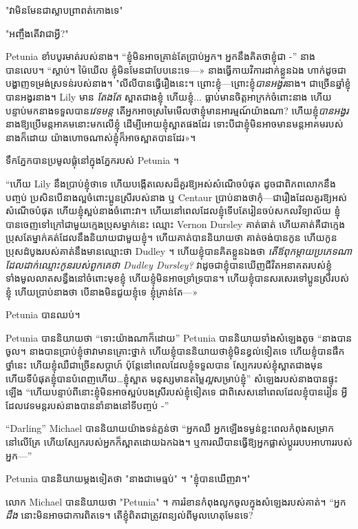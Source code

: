 "វាមិនមែនជាស្លាបព្រាពត់កោងទេ"

"អញ្ចឹងតើវាជាអ្វី?"

Petunia ខាំបបូរមាត់របស់នាង។ “ខ្ញុំ​មិន​អាច​គ្រាន់​តែ​ប្រាប់​អ្នក​។ អ្នកនឹងគិតថាខ្ញុំជា -” នាងបានលេប។ “ស្តាប់។ ម៉ៃឃើល ខ្ញុំ​មិន​មែន​ជា​បែប​នេះ​ទេ—» នាង​ធ្វើ​កាយវិការ​ដាក់​ខ្លួន​ឯង ហាក់​ដូច​ជា​បង្ហាញ​ទម្រង់​ស្រទន់​របស់​នាង។ "លីលីបានធ្វើរឿងនេះ។ ព្រោះខ្ញុំ—ព្រោះខ្ញុំ\emph{បានអង្វរ}នាង។ ជាច្រើនឆ្នាំខ្ញុំបានអង្វរនាង។ Lily មាន \emph{តែងតែ} ស្អាតជាងខ្ញុំ ហើយខ្ញុំ... ធ្លាប់មានចិត្តអាក្រក់ចំពោះនាង ហើយបន្ទាប់មកនាងទទួលបាន\emph{វេទមន្ត} តើអ្នកអាចស្រមៃមើលថាខ្ញុំមានអារម្មណ៍យ៉ាងណា? ហើយខ្ញុំ\emph{បានអង្វរ}នាងឱ្យប្រើមន្តអាគមនោះមកលើខ្ញុំ ដើម្បីអោយខ្ញុំស្អាតផងដែរ ទោះបីជាខ្ញុំមិនអាចមានមន្តអាគមរបស់នាងក៏ដោយ យ៉ាងហោចណាស់ខ្ញុំក៏អាចស្អាតបានដែរ»។

ទឹកភ្នែកបានប្រមូលផ្តុំនៅក្នុងភ្នែករបស់ Petunia ។

“ហើយ Lily នឹងប្រាប់ខ្ញុំថាទេ ហើយបង្កើតលេសដ៏គួរឱ្យអស់សំណើចបំផុត ដូចជាពិភពលោកនឹងបញ្ចប់ ប្រសិនបើនាងល្អចំពោះប្អូនស្រីរបស់នាង ឬ Centaur ប្រាប់នាងថាកុំ—ជារឿងដែលគួរឱ្យអស់សំណើចបំផុត ហើយខ្ញុំស្អប់នាងចំពោះវា។ ហើយនៅពេលដែលខ្ញុំទើបតែរៀនចប់សកលវិទ្យាល័យ ខ្ញុំបានចេញទៅក្រៅជាមួយក្មេងប្រុសម្នាក់នេះ ឈ្មោះ Vernon Dursley គាត់ធាត់ ហើយគាត់គឺជាក្មេងប្រុសតែម្នាក់គត់ដែលនឹងនិយាយជាមួយខ្ញុំ។ ហើយ​គាត់​បាន​និយាយ​ថា គាត់​ចង់​បាន​កូន ហើយ​កូន​ប្រុស​ដំបូង​របស់​គាត់​នឹង​មាន​ឈ្មោះ​ថា Dudley ។ ហើយខ្ញុំបានគិតខ្លួនឯងថា \emph{តើឪពុកម្តាយប្រភេទណាដែលដាក់ឈ្មោះកូនរបស់ពួកគេថា Dudley Dursley?} វាដូចជាខ្ញុំបានឃើញជីវិតអនាគតរបស់ខ្ញុំទាំងមូលលាតសន្ធឹងនៅចំពោះមុខខ្ញុំ ហើយខ្ញុំមិនអាចទ្រាំទ្របាន។ ហើយ​ខ្ញុំ​បាន​សរសេរ​ទៅ​ប្អូន​ស្រី​របស់​ខ្ញុំ ហើយ​ប្រាប់​នាង​ថា បើ​នាង​មិន​ជួយ​ខ្ញុំ​ទេ ខ្ញុំ​គ្រាន់​តែ—»

Petunia បានឈប់។

Petunia បាននិយាយថា “ទោះយ៉ាងណាក៏ដោយ” Petunia បាននិយាយទាំងសំឡេងតូច “នាងបានចូល។ នាងបានប្រាប់ខ្ញុំថាវាមានគ្រោះថ្នាក់ ហើយខ្ញុំបាននិយាយថាខ្ញុំមិនខ្វល់ទៀតទេ ហើយខ្ញុំបានផឹកថ្នាំនេះ ហើយខ្ញុំឈឺជាច្រើនសប្តាហ៍ ប៉ុន្តែនៅពេលដែលខ្ញុំទទួលបាន ស្បែករបស់ខ្ញុំស្អាតជាងមុន ហើយទីបំផុតខ្ញុំបានបំពេញហើយ…ខ្ញុំស្អាត មនុស្សមានតម្លៃ\emph{ល្អ}សម្រាប់ខ្ញុំ” សំឡេងរបស់នាងបានផ្ទុះឡើង “ហើយបន្ទាប់ពីនោះខ្ញុំមិនអាចស្អប់បងស្រីរបស់ខ្ញុំទៀតទេ ជាពិសេសនៅពេលដែលខ្ញុំបានរៀន អ្វីដែលវេទមន្តរបស់នាងបាននាំនាងនៅទីបញ្ចប់ -”

“Darling” Michael បាននិយាយយ៉ាងទន់ភ្លន់ថា “អ្នកឈឺ អ្នកឡើងទម្ងន់ខ្លះពេលកំពុងសម្រាកនៅលើគ្រែ ហើយស្បែករបស់អ្នកក៏ស្អាតដោយឯកឯង។ ឬការឈឺបានធ្វើឱ្យអ្នកផ្លាស់ប្តូររបបអាហាររបស់អ្នក—”

Petunia បាននិយាយម្តងទៀតថា "នាងជាមេធ្មប់" ។ "ខ្ញុំបានឃើញវា។"

លោក Michael បាននិយាយថា "Petunia" ។ ការ​រំខាន​កំពុង​លូក​ចូល​ក្នុង​សំឡេង​របស់​គាត់។ “អ្នក \emph{ដឹង} នោះមិនអាចជាការពិតទេ។ តើខ្ញុំពិតជាត្រូវពន្យល់ពីមូលហេតុមែនទេ?

